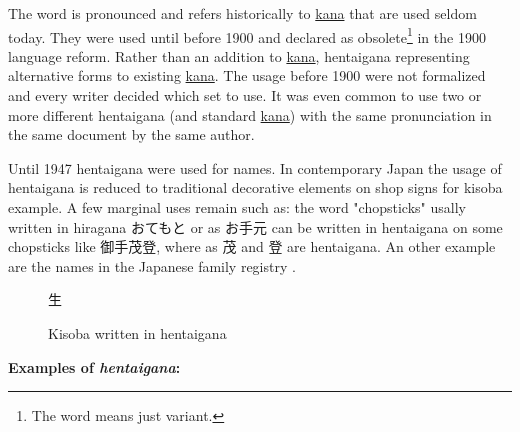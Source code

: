 The word \lhentaigana{} is pronounced  and refers historically
to \hyperref[sec:Kana]{kana} that are used seldom today. They were used until
before 1900 and declared as obsolete\footnote{The word  means just
variant.} in the 1900 language reform. Rather than an addition to
\hyperref[sec:Kana]{kana}, hentaigana representing alternative forms
to existing \hyperref[sec:Kana]{kana}. The usage before 1900 were not formalized and every
writer decided which set to use. It was even common to use two or more
different hentaigana (and standard \hyperref[sec:Kana]{kana}) with the
same pronunciation in the same document by the same author.

Until 1947 hentaigana were used for names. In contemporary Japan the usage of
 hentaigana is reduced to traditional decorative elements on shop signs for 
kisoba example. A few marginal uses remain such as: the word "chopsticks" 
  usally written in hiragana {おてもと} or as
{お手元} can be written in hentaigana on some chopsticks like {御手茂登}, where as
{茂} and {登} are hentaigana. An other example are the names in the Japanese 
family registry \lkoseki{}.



\begin{figure}[H]
\begin{center}
\Huge
生𛁛𛂦゙   %
\end{center}
\caption{Kisoba written in hentaigana}
\label{fig:KisobaWrittenInHentaigana}
\end{figure}

\bigskip

\textbf{Examples of \textit{hentaigana}:}

